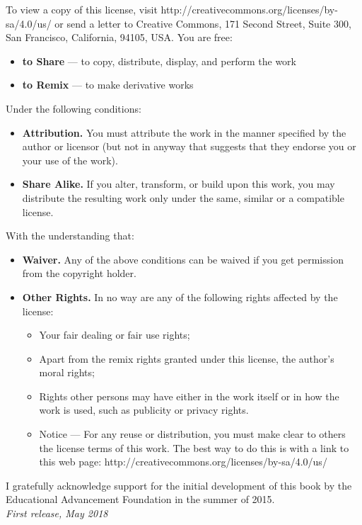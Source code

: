 \documentclass{book}
\newcommand{\<}{\left\langle}
\renewcommand{\>}{\right\rangle}
\theoremstyle{definition}
\begin{document}
To view a copy of this license, visit http://creativecommons.org/licenses/by-sa/4.0/us/ or send a letter to Creative Commons, 171 Second Street, Suite 300, San Francisco, California, 94105, USA.
You are free:
\begin{itemize}
	\item {\bf to Share} — to copy, distribute, display, and perform the work
	\item {\bf to Remix} — to make derivative works
\end{itemize}
Under the following conditions:
\begin{itemize}
	\item {\bf Attribution.} You must attribute the work in the manner specified by the author or licensor (but not in anyway that suggests that they endorse you or your use of the work).
	\item {\bf Share Alike.} If you alter, transform, or build upon this work, you may distribute the resulting work only under the same, similar or a compatible license.
\end{itemize}
With the understanding that:
\begin{itemize}
	\item {\bf Waiver.} Any of the above conditions can be waived if you get permission from the copyright holder.
	\item {\bf Other Rights.} In no way are any of the following rights affected by the license:
		\begin{itemize}
			\item Your fair dealing or fair use rights;
			\item Apart from the remix rights granted under this license, the author's moral rights;
			\item Rights other persons may have either in the work itself or in how the work is used, such as publicity or privacy rights.
			\item Notice — For any reuse or distribution, you must make clear to others the license terms of this work. The best way to do this is with a link to this web page:
http://creativecommons.org/licenses/by-sa/4.0/us/
\end{itemize}
\end{itemize}
 I gratefully acknowledge support for the initial development of this book by the Educational Advancement Foundation in the summer of 2015. \\ %

\noindent \textit{First release, May 2018} %
\end{document}

